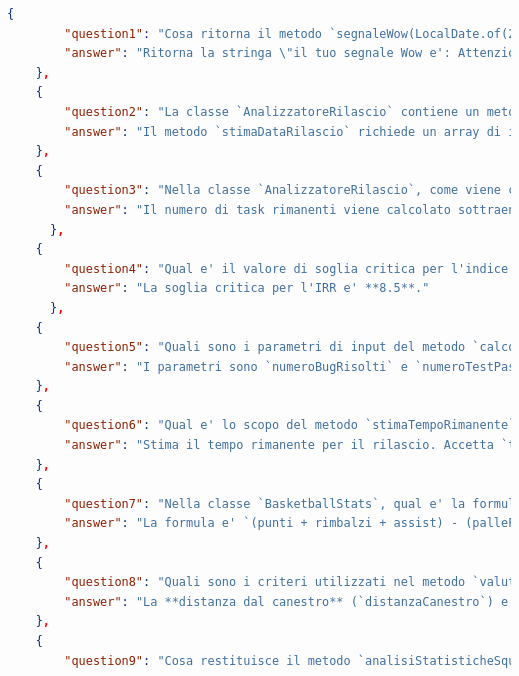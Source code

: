 \documentclass[12pt,a4paper,openright,twoside]{book}
\begin{document}
\begin{lstlisting}[language=json, caption={Domande/Risposte generate da NotebookLM}]
    {
        "question1": "Cosa ritorna il metodo `segnaleWow(LocalDate.of(2025, 2, 14))` che utilizza la funzione `getMessaggioMagico()` della libreria `DateUtilCustom`?",
        "answer": "Ritorna la stringa \"il tuo segnale Wow e': Attenzione agli incantesimi del crepuscolo.\""
    },
    {
        "question2": "La classe `AnalizzatoreRilascio` contiene un metodo chiamato `stimaDataRilascio`. Quali sono i due parametri di input richiesti da questo metodo?",
        "answer": "Il metodo `stimaDataRilascio` richiede un array di interi (`int[] taskCompletati`) e un valore double (`double velocitaSviluppo`) come input."
    },
    {
        "question3": "Nella classe `AnalizzatoreRilascio`, come viene calcolato il numero di task rimanenti nel metodo `stimaDataRilascio`?",
        "answer": "Il numero di task rimanenti viene calcolato sottraendo la somma dei task completati (assumendo un totale di 100 task)."
      },
    {
        "question4": "Qual e' il valore di soglia critica per l'indice di rischio rilascio (IRR) nella classe `AnalizzatoreRilascio`?",
        "answer": "La soglia critica per l'IRR e' **8.5**."
      },
    {
        "question5": "Quali sono i parametri di input del metodo `calcolaProbabilitaSuccesso` nella classe `AnalizzatoreRilascio` e come viene calcolata la probabilita' di successo?",
        "answer": "I parametri sono `numeroBugRisolti` e `numeroTestPassati`. La probabilita' di successo e' calcolata come `(numeroBugRisolti * 0.4) + (numeroTestPassati * 0.6)`."
    },
    {
        "question6": "Qual e' lo scopo del metodo `stimaTempoRimanente` nella classe `AnalizzatoreRilascio` e quali parametri accetta?",
        "answer": "Stima il tempo rimanente per il rilascio. Accetta `taskRimanenti` (numero di task rimanenti) e `velocitaSviluppo` come parametri."
    },
    {
        "question7": "Nella classe `BasketballStats`, qual e' la formula utilizzata per calcolare l'efficienza di un giocatore nel metodo `calcolaEfficienzaGiocatore`?",
        "answer": "La formula e' `(punti + rimbalzi + assist) - (pallePerse + tiriSbagliati)`."
    },
    {
        "question8": "Quali sono i criteri utilizzati nel metodo `valutaTiro` della classe `BasketballStats` per valutare la qualita' di un tiro?",
        "answer": "La **distanza dal canestro** (`distanzaCanestro`) e la **pressione difensiva** (`pressioneDifensiva`)."
    },
    {
        "question9": "Cosa restituisce il metodo `analisiStatisticheSquadra` della classe `BasketballStats`?",

\end{lstlisting}
\end{document}
